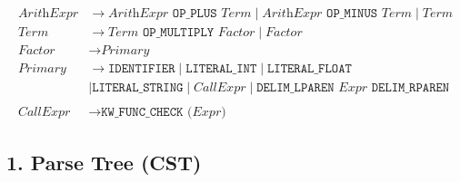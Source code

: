 \documentclass[11pt, letterpaper]{article}
\begin{document}
\begin{align*}
\textit{ArithExpr} &\to \textit{ArithExpr} \texttt{ OP\_PLUS } \textit{Term} \mid \textit{ArithExpr} \texttt{ OP\_MINUS } \textit{Term} \mid \textit{Term} \\
\textit{Term} &\to \textit{Term} \texttt{ OP\_MULTIPLY } \textit{Factor} \mid \textit{Factor} \\
\textit{Factor} &\to \textit{Primary} \\
\textit{Primary} &\to \texttt{IDENTIFIER} \mid \texttt{LITERAL\_INT} \mid \texttt{LITERAL\_FLOAT} \\
&\mid \texttt{LITERAL\_STRING} \mid \textit{CallExpr} \mid \texttt{DELIM\_LPAREN} \textit{ Expr} \texttt{ DELIM\_RPAREN} \\
\\
\textit{CallExpr} &\to \texttt{KW\_FUNC\_CHECK} \texttt{ (} \textit{Expr} \texttt{)}
\end{align*}
\subsection*{1. Parse Tree (CST)}
\end{document}
